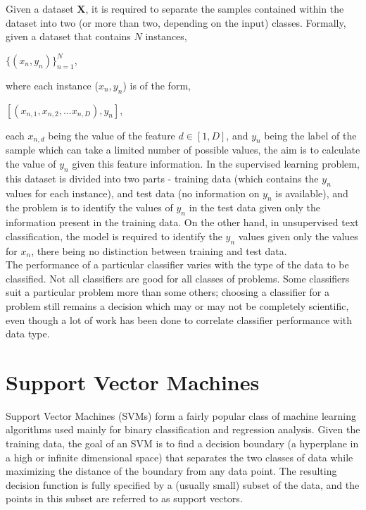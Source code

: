 Given a dataset $\mathbf{X}$, it is required to separate the samples contained within the dataset into two (or more than two, depending on the input) classes. Formally, given a dataset that contains $N$ instances,

\begin{center}
    $\{(x_n, y_n)\}_{n = 1}^{N}$,
\end{center}

where each instance ($x_n, y_n$) is of the form,

\begin{center}
    $[(x_{n, 1}, x_{n, 2}, ... x_{n, D}), y_{n}]$,
\end{center}

each $x_{n, d}$ being the value of the feature $d \in [1, D]$, and $y_n$ being the label of the sample which can take a limited number of possible values, the aim is to calculate the value of $y_n$ given this feature information. In the supervised learning problem, this dataset is divided into two parts - training data (which contains the $y_n$ values for each instance), and test data (no information on $y_n$ is available), and the problem is to identify the values of $y_n$ in the test data given only the information present in the training data. On the other hand, in unsupervised text classification, the model is required to identify the $y_n$ values given only the values for $x_n$, there being no distinction between training and test data.\\

The performance of a particular classifier varies with the type of the data to be classified. Not all classifiers are good for all classes of problems. Some classifiers suit a particular problem more than some others; choosing a classifier for a problem still remains a decision which may or may not be completely scientific, even though a lot of work has been done to correlate classifier performance with data type.

\section{Support Vector Machines}
Support Vector Machines (SVMs) form a fairly popular class of machine learning algorithms used mainly for binary classification and regression analysis. Given the training data, the goal of an SVM is to find a decision boundary (a hyperplane in a high or infinite dimensional space) that separates the two classes of data while maximizing the distance of the boundary from any data point. The resulting decision function is fully specified by a (usually small) subset of the data, and the points in this subset are referred to as support vectors.\\

